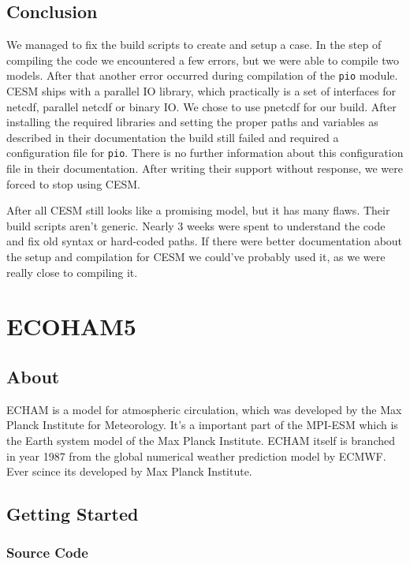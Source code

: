 \documentclass[]{article}
\begin{document}
\subsection{Conclusion}\label{conclusion}

We managed to fix the build scripts to create and setup a case. In the
step of compiling the code we encountered a few errors, but we were able
to compile two models. After that another error occurred during
compilation of the \texttt{pio} module. CESM ships with a parallel IO
library, which practically is a set of interfaces for netcdf, parallel
netcdf or binary IO. We chose to use pnetcdf for our build. After
installing the required libraries and setting the proper paths and
variables as described in their documentation the build still failed and
required a configuration file for \texttt{pio}. There is no further
information about this configuration file in their documentation. After
writing their support without response, we were forced to stop using
CESM.

After all CESM still looks like a promising model, but it has many
flaws. Their build scripts aren't generic. Nearly 3 weeks were spent to
understand the code and fix old syntax or hard-coded paths. If there
were better documentation about the setup and compilation for CESM we
could've probably used it, as we were really close to compiling it.

\section{ECOHAM5}\label{ecoham5}

\subsection{About}\label{about}

ECHAM is a model for atmospheric circulation, which was developed by the
Max Planck Institute for Meteorology. It's a important part of the
MPI-ESM which is the Earth system model of the Max Planck Institute.
ECHAM itself is branched in year 1987 from the global numerical weather
prediction model by ECMWF. Ever scince its developed by Max Planck
Institute.

\subsection{Getting Started}\label{getting-started-1}

\subsubsection{Source Code}\label{source-code}
\end{document}
